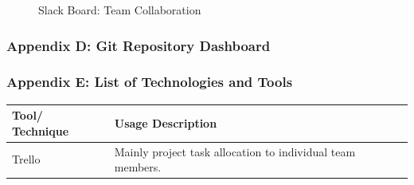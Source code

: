 \documentclass[12pt]{article} %
\begin{document}
		
	\begin{figure}[H] %
		\caption{Slack Board: Team Collaboration}
		\label{fig:speciation}
	\end{figure}
		
		\newpage
	
	\subsubsection{Appendix D: Git Repository Dashboard}
	
	\newpage
	
	\subsubsection{Appendix E: List of Technologies and Tools}
	
	 \begin{center}
	 	\begin{tabular}{ | l | p{12cm} |}
	 		\hline
	 		Tool/ Technique & Usage Description \\
	 		\hline
	 		Trello & Mainly project task allocation to individual team members.\\
	 		\hline
	 	\end{tabular}
	 \end{center}
	 
	
	
\end{document}
